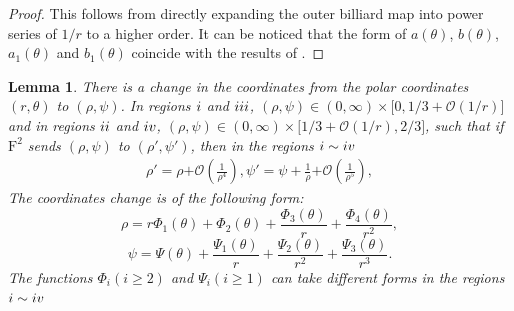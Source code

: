 \documentclass{article}
\numberwithin{figure}{section}
\numberwithin{equation}{section}
\newtheorem{lemma}{Lemma}
\theoremstyle{remark}
\theoremstyle{definition}
\begin{document}
\begin{proof}
	This follows from directly expanding the outer billiard map into power series of \(1/r\)
to a higher order. It can be noticed that the form of \(a(\theta)\),
	\(b(\theta)\), \(a_{1}(\theta)\) and \(b_{1}(\theta)\) coincide with the
results of \cite{dolgopyat_unbounded_2009}.
\end{proof}
\begin{lemma}\label{rho_psi}
	There is a change in the coordinates from the polar coordinates \((r,\theta)\) to \((\rho,\psi)\). In regions $\uppercase\expandafter{\romannumeral1}$ and $\uppercase\expandafter{\romannumeral3}$,
	\((\rho,\psi) \in (0,\infty) \times \lbrack 0,1/3 + \mathcal{O}(1/r)\rbrack\)
	and in regions $\uppercase\expandafter{\romannumeral2}$ and $\uppercase\expandafter{\romannumeral4}$,
	\((\rho,\psi) \in (0,\infty) \times \lbrack 1/3 + \mathcal{O}(1/r),2/3\rbrack\), such
	that if \(\text{F}^{\text{2}}\) sends \((\rho,\psi)\) to \((\rho',\psi')\), then in the regions $\uppercase\expandafter{\romannumeral1} \sim \uppercase\expandafter{\romannumeral4}$
	\begin{align}\label{coord_1}
		\rho' = \rho\mathcal{+ O}\left( \frac{1}{\rho^4} \right),
		\psi' = \psi + \frac{1}{\rho}\mathcal{+ O}\left( \frac{1}{\rho^5} \right),\end{align}
	The coordinates change is of the following form:
	\begin{equation}\label{coor_pho}
		\rho = r\Phi_{1}(\theta) + \Phi_{2}(\theta) + \frac{\Phi_{3}(\theta)}{r} + \frac{\Phi_{4}(\theta)}{r^{2}},\end{equation}
	\begin{equation}\label{coor_psai}
		\psi = \Psi(\theta) + \frac{\Psi_{1}(\theta)}{r} + \frac{\Psi_{2}(\theta)}{r^{2}} + \frac{\Psi_{3}(\theta)}{r^{3}}.
	\end{equation}
	The functions \(\Phi_{i}(i \geq 2)\) and \(\Psi_{i}(i \geq 1)\) can take different forms in the regions $\uppercase\expandafter{\romannumeral1}\sim \uppercase\expandafter{\romannumeral4}$
\end{lemma}
\end{document}
